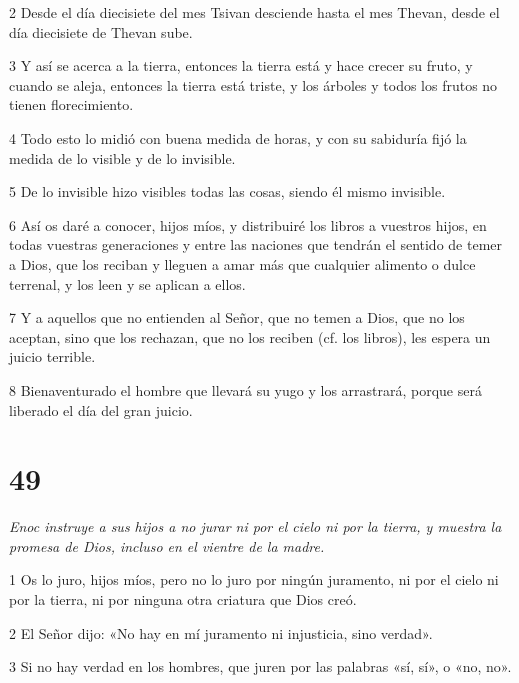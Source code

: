 \par 2 Desde el día diecisiete del mes Tsivan desciende hasta el mes Thevan, desde el día diecisiete de Thevan sube.

\par 3 Y así se acerca a la tierra, entonces la tierra está y hace crecer su fruto, y cuando se aleja, entonces la tierra está triste, y los árboles y todos los frutos no tienen florecimiento.

\par 4 Todo esto lo midió con buena medida de horas, y con su sabiduría fijó la medida de lo visible y de lo invisible.

\par 5 De lo invisible hizo visibles todas las cosas, siendo él mismo invisible.

\par 6 Así os daré a conocer, hijos míos, y distribuiré los libros a vuestros hijos, en todas vuestras generaciones y entre las naciones que tendrán el sentido de temer a Dios, que los reciban y lleguen a amar más que cualquier alimento o dulce terrenal, y los leen y se aplican a ellos.

\par 7 Y a aquellos que no entienden al Señor, que no temen a Dios, que no los aceptan, sino que los rechazan, que no los reciben (cf. los libros), les espera un juicio terrible.

\par 8 Bienaventurado el hombre que llevará su yugo y los arrastrará, porque será liberado el día del gran juicio.

\chapter{49}

\par \textit{Enoc instruye a sus hijos a no jurar ni por el cielo ni por la tierra, y muestra la promesa de Dios, incluso en el vientre de la madre.}

\par 1 Os lo juro, hijos míos, pero no lo juro por ningún juramento, ni por el cielo ni por la tierra, ni por ninguna otra criatura que Dios creó.

\par 2 El Señor dijo: «No hay en mí juramento ni injusticia, sino verdad».

\par 3 Si no hay verdad en los hombres, que juren por las palabras «sí, sí», o «no, no».

